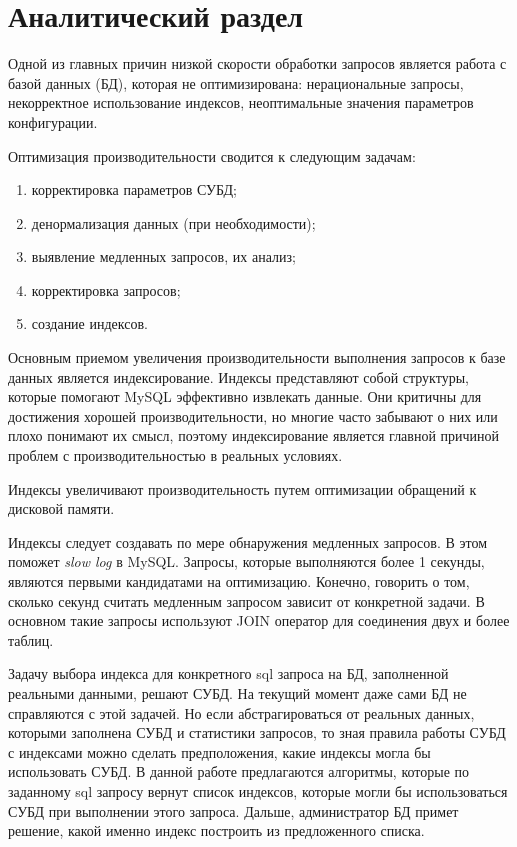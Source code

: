\chapter{Аналитический раздел}

Одной из главных причин низкой скорости обработки запросов является работа с базой данных (БД), которая не оптимизирована: нерациональные запросы, некорректное использование индексов, неоптимальные значения параметров конфигурации. 

Оптимизация производительности сводится к следующим задачам: 
\begin{enumerate}
\item корректировка параметров СУБД;
\item денормализация данных (при необходимости);
\item выявление медленных запросов, их анализ;
\item корректировка запросов;
\item создание индексов.
\end{enumerate}

Основным приемом увеличения производительности выполнения запросов к базе данных является индексирование. Индексы представляют собой структуры, которые помогают MySQL эффективно извлекать данные. Они критичны для достижения хорошей производительности, но многие часто забывают о них или плохо понимают их смысл, поэтому индексирование является главной причиной проблем с производительностью в реальных условиях. \cite{zaitsev}

Индексы увеличивают производительность путем оптимизации обращений к дисковой памяти.

Индексы следует создавать по мере обнаружения медленных запросов. В этом поможет \textit{slow log} в MySQL. Запросы, которые выполняются более 1 секунды, являются первыми кандидатами на оптимизацию. \cite{ruhighload-mysql-indexes} Конечно, говорить о том, сколько секунд считать медленным запросом зависит от конкретной задачи. В основном такие запросы используют JOIN оператор для соединения двух и более таблиц.

Задачу выбора индекса для конкретного sql запроса на БД, заполненной реальными данными, решают СУБД. На текущий момент даже сами БД не справляются с этой задачей. Но если абстрагироваться от реальных данных, которыми заполнена СУБД и статистики запросов, то зная правила работы СУБД с индексами можно сделать предположения, какие индексы могла бы использовать СУБД. В данной работе предлагаются алгоритмы, которые по заданному sql запросу вернут список индексов, которые могли бы использоваться СУБД при выполнении этого запроса. Дальше, администратор БД примет решение, какой именно индекс построить из предложенного списка.





